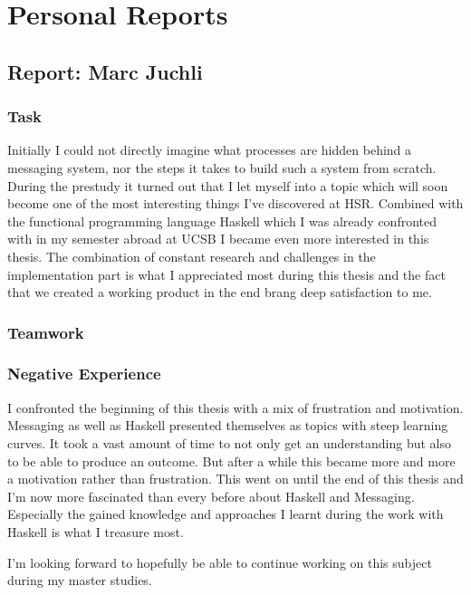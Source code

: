 \chapter{Personal Reports}

\section*{Report: Marc Juchli}

\subsection*{Task}

Initially I could not directly imagine what processes are hidden behind a
messaging system, nor the steps it takes to build such a system from scratch.
During the prestudy it turned out that I let myself into a topic which will soon
become one of the most interesting things I've discovered at HSR. Combined with
the functional programming language Haskell which I was already confronted with
in my semester abroad at UCSB I became even more interested in this thesis.  The
combination of constant research and challenges in the implementation part is
what I appreciated most during this thesis and the fact that we created a
working product in the end brang deep satisfaction to me.


\subsection*{Teamwork}



\subsection*{Negative Experience}

I confronted the beginning of this thesis with a mix of frustration and
motivation. Messaging as well as Haskell presented themselves as topics with
steep learning curves. It took a vast amount of time to not only get an
understanding but also to be able to produce an outcome. But after a while this
became more and more a motivation rather than frustration. This went on until
the end of this thesis and I'm now more fascinated than every before about
Haskell and Messaging. Especially the gained knowledge and approaches I learnt
during the work with Haskell is what I treasure most.

I'm looking forward to hopefully be able to continue working on this subject
during my master studies.


